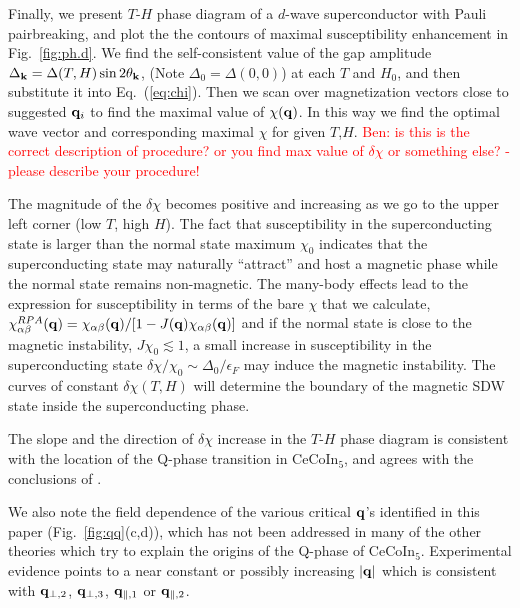 \documentclass[aps,prl,twocolumn,showpacs,amsmath,amssymb]{revtex4-1}
\newcommand{\red}{\textcolor{red}}
\newcommand{\cecoin}{CeCoIn$_5$}
\begin{document}
%
Finally, we present $T$-$H$ phase diagram of a $d$-wave superconductor with Pauli pairbreaking, 
and plot the the contours of maximal susceptibility enhancement in Fig.~\ref{fig:ph.d}. 
We find the self-consistent value of the 
gap amplitude $\Delta_{\bf k} = \Delta(T,H) \sin2\theta_{\bf k}$, (Note $\Delta_0 = \Delta(0,0)$) 
at each $T$ and $H_0$, and then substitute it into Eq.~(\ref{eq:chi}). 
Then we scan over magnetization vectors close to suggested ${\bf q}_i$ to find the maximal value of 
$\chi({\bf q})$. In this way we find the optimal wave vector and corresponding maximal $\chi$ for 
given $T$,$H$. 
\red{Ben: is this is the correct description of procedure? or you find max value of $\delta \chi$ or 
something else? - please describe your procedure!}

The magnitude of the $\delta \chi$ becomes positive and increasing as we go to the 
upper left corner (low $T$, high $H$). The fact that susceptibility in the superconducting state 
is larger than the normal state maximum $\chi_0$ indicates that the superconducting state 
may naturally ``attract'' and host a magnetic phase while the normal state remains non-magnetic. 
The many-body effects lead to the expression for susceptibility in terms of the 
bare $\chi$ that we calculate, 
$\chi^{RPA}_{\alpha\beta}({\bf q})={\chi_{\alpha\beta} ({\bf q}) }/{[1-J({\bf q}) \chi_{\alpha\beta}({\bf q})]}$
and if the normal state is close to the magnetic instability, $J \chi_0 \lesssim 1$, 
a small increase in susceptibility 
in the superconducting state $\delta\chi/\chi_0 \sim \Delta_0/\epsilon_F$ 
may induce the magnetic instability. The curves of constant 
$\delta\chi(T,H)$ will determine the boundary of the magnetic SDW 
state inside the superconducting phase. 

The slope and the direction of $\delta\chi$ increase in the $T$-$H$ phase diagram is consistent with 
the location of the Q-phase transition in \cecoin, and agrees with the conclusions of 
\cite{sc_afm_kato}. 

We also note the field dependence of the various critical ${\bf q}$'s identified in
this paper (Fig.~\ref{fig:qq}(c,d)), which has not been addressed in many of
the other theories which try to explain the origins of the Q-phase of
CeCoIn$_5$. Experimental evidence points to a near constant or possibly
increasing $|{\bf q}|$ which is consistent with ${\bf q}_{\perp,2}$, ${\bf q}_{\perp,3}$,
${\bf q}_{\parallel,1}$ or ${\bf q}_{\parallel,2}$.
\cite{sc_sdw_anton,mag_afm_fflo_sigrist,fflo_pen_depth,sc_afm_kato,sc_afm_ikeda,sdw_vortex,
cecoin5_Kenzelmann2}
\end{document}
